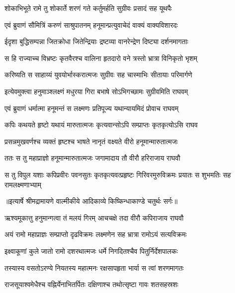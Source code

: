 \twolineshloka
{शोकाभिभूते रामे तु शोकार्ते शरणं गते}
{कर्तुमर्हति सुग्रीवः प्रसादं सह यूथपैः} %

\twolineshloka
{एवं ब्रुवाणं सौमित्रिं करुणं साश्रुपातनम्}
{हनूमान्प्रत्युवाचेदं वाक्यं वाक्यविशारदः} %

\twolineshloka
{ईदृशा बुद्धिसम्पन्ना जितक्रोधा जितेन्द्रियाः}
{द्रष्टव्या वानरेन्द्रेण दिष्ट्या दर्शनमागताः} %

\twolineshloka
{स हि राज्याच्च विभ्रष्टः कृतवैरश्च वालिना}
{हृतदारो वने त्रस्तो भ्रात्रा विनिकृतो भृशम्} %

\twolineshloka
{करिष्यति स साहाय्यं युवयोर्भास्करात्मजः}
{सुग्रीवः सह चास्माभिः सीतायाः परिमार्गणे} %

\twolineshloka
{इत्येवमुक्त्वा हनुमाञ्श्लक्ष्णं मधुरया गिरा}
{बभाषे सोऽभिगच्छामः सुग्रीवमिति राघवम्} %

\twolineshloka
{एवं ब्रुवाणं धर्मात्मा हनूमन्तं स लक्ष्मणः}
{प्रतिपूज्य यथान्यायमिदं प्रोवाच राघवम्} %

\twolineshloka
{कपिः कथयते हृष्टो यथायं मारुतात्मजः}
{कृत्यवान्सोऽपि सम्प्राप्तः कृतकृत्योऽसि राघव} %

\twolineshloka
{प्रसन्नमुखवर्णश्च व्यक्तं हृष्टश्च भाषते}
{नानृतं वक्ष्यते वीरो हनूमान्मारुतात्मजः} %

\twolineshloka
{ततः स तु महाप्राज्ञो हनूमान्मारुतात्मजः}
{जगामादाय तौ वीरौ हरिराजाय राघवौ} %

\fourlineindentedshloka
{स तु विपुल यशाः कपिप्रवीरः}
{पवनसुतः कृतकृत्यवत्प्रहृष्टः}
{गिरिवरमुरुविक्रमः प्रयातः}
{स शुभमतिः सह रामलक्ष्मणाभ्याम्} %


{॥इत्यार्षे श्रीमद्रामायणे वाल्मीकीये आदिकाव्ये किष्किन्धाकाण्डे चतुर्थः सर्गः॥}


\twolineshloka
{ऋश्यमूकात्तु हनुमान्गत्वा तं मलयं गिरम्}
{आचचक्षे तदा वीरौ कपिराजाय राघवौ} %

\twolineshloka
{अयं रामो महाप्राज्ञः सम्प्राप्तो दृढविक्रमः}
{लक्ष्मणेन सह भ्रात्रा रामोऽयं सत्यविक्रमः} %

\twolineshloka
{इक्ष्वाकूणां कुले जातो रामो दशरथात्मजः}
{धर्मे निगदितश्चैव पितुर्निर्देशपालकः} %

\twolineshloka
{तस्यास्य वसतोऽरण्ये नियतस्य महात्मनः}
{रक्षसापहृता भार्या स त्वां शरणमागतः} %

\twolineshloka
{राजसूयाश्वमेधैश्च वह्निर्येनाभितर्पितः}
{दक्षिणाश्च तथोत्सृष्टा गावः शतसहस्रशः} %

